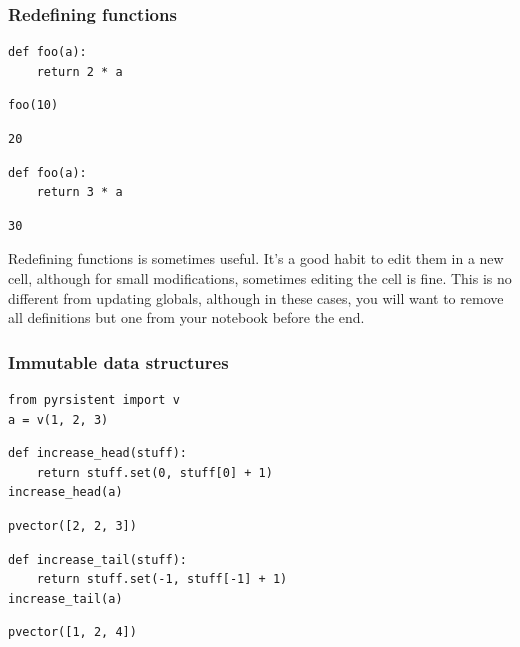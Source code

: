 \begin{frame}[fragile]
\frametitle{Redefining functions}

\begin{lstlisting}[frame=single]
def foo(a):
    return 2 * a
\end{lstlisting}

\begin{lstlisting}[frame=single]
foo(10)
\end{lstlisting}

\begin{lstlisting}[frame=single]
20
\end{lstlisting}

\begin{lstlisting}[frame=single]
def foo(a):
    return 3 * a
\end{lstlisting}

\begin{lstlisting}[frame=single]
30
\end{lstlisting}

\end{frame}

Redefining functions is sometimes useful.
It's a good habit to edit them in a new cell,
although for small modifications,
sometimes editing the cell is fine.
This is no different from updating globals,
although in these cases,
you will want to remove all definitions
but one from your notebook before the end.

\begin{frame}[fragile]
\frametitle{Immutable data structures}

\begin{lstlisting}[frame=single]
from pyrsistent import v
a = v(1, 2, 3)
\end{lstlisting}

\begin{lstlisting}[frame=single]
def increase_head(stuff):
    return stuff.set(0, stuff[0] + 1)
increase_head(a)
\end{lstlisting}

\begin{lstlisting}[frame=single]
pvector([2, 2, 3])
\end{lstlisting}

\begin{lstlisting}[frame=single]
def increase_tail(stuff):
    return stuff.set(-1, stuff[-1] + 1)
increase_tail(a)
\end{lstlisting}

\begin{lstlisting}[frame=single]
pvector([1, 2, 4])
\end{lstlisting}

\end{frame}

